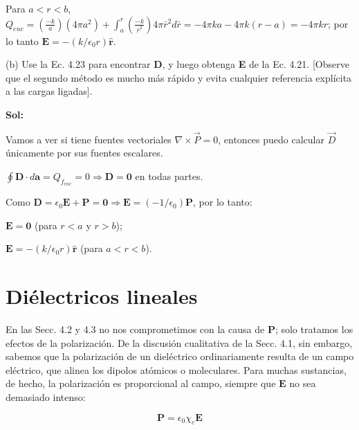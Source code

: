 \documentclass[12pt,a4paper]{report}
\newcommand{\esp}{\vspace{0.5cm}}
\begin{document}
	Para $a < r < b$, $Q_{enc} = \left( \frac{-k}{a} \right) (4\pi a^2) + \int_{a}^{r} \left( \frac{-k}{\bar{r}^2} \right) 4\pi\bar{r}^2 d\bar{r} = -4\pi ka - 4\pi k(r - a) = -4\pi kr$; por lo tanto $\mathbf{E} = -(k/\epsilon_0 r) \hat{\mathbf{r}}.$
	
	\esp
	
	(b) Use la Ec. 4.23 para encontrar \textbf{D}, y luego obtenga \textbf{E} de la Ec. 4.21. [Observe que el segundo método es mucho más rápido y evita cualquier referencia explícita a las cargas ligadas].
	
	\esp
	
	\noindent \textbf{Sol:}
	
	\esp
	
	\begin{nota}
		Vamos a ver si tiene fuentes vectoriales $\nabla \times \vec{P} = 0$, entonces puedo calcular $\vec{D}$ únicamente por sus fuentes escalares.
	\end{nota}
	
	\esp
	
	$\oint \mathbf{D} \cdot d\mathbf{a} = Q_{f_{enc}} = 0 \Rightarrow \mathbf{D} = \mathbf{0}$ en todas partes.
	
	\esp
	
	Como $\mathbf{D} = \epsilon_0 \mathbf{E} + \mathbf{P} = \mathbf{0} \Rightarrow \mathbf{E} = (-1/\epsilon_0)\mathbf{P}$, por lo tanto:
	
	\esp
	
	$\mathbf{E} = \mathbf{0}$ (para $r < a$ y $r > b$); 
	
	\esp
	
	$\mathbf{E} = -(k/\epsilon_0 r) \hat{\mathbf{r}}$ (para $a < r < b$).
	
	\section{Diélectricos lineales}

	En las Secc. 4.2 y 4.3 no nos comprometimos con la causa de $\mathbf{P}$; solo tratamos los efectos de la polarización. De la discusión cualitativa de la Secc. 4.1, sin embargo, sabemos que la polarización de un dieléctrico ordinariamente resulta de un campo eléctrico, que alinea los dipolos atómicos o moleculares. Para muchas sustancias, de hecho, la polarización es proporcional al campo, siempre que $\mathbf{E}$ no sea demasiado intenso:
	
	\esp
	
	\begin{equation}
		\mathbf{P} = \epsilon_0 \chi_e \mathbf{E}
		\label{eq:pol}
	\end{equation}
	
\end{document}

